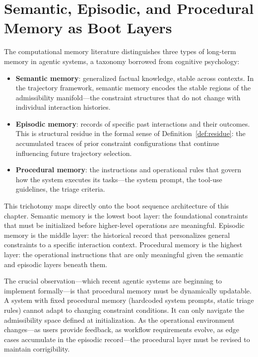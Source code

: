 \section{Semantic, Episodic, and Procedural Memory as Boot Layers}

The computational memory literature distinguishes three types of long-term memory
in agentic systems, a taxonomy borrowed from cognitive psychology:

\begin{itemize}
  \item \textbf{Semantic memory}: generalized factual knowledge, stable across
    contexts. In the trajectory framework, semantic memory encodes the stable
    regions of the admissibility manifold---the constraint structures that do
    not change with individual interaction histories.
  \item \textbf{Episodic memory}: records of specific past interactions and
    their outcomes. This is structural residue in the formal sense of
    Definition~\ref{def:residue}: the accumulated traces of prior constraint
    configurations that continue influencing future trajectory selection.
  \item \textbf{Procedural memory}: the instructions and operational rules that
    govern how the system executes its tasks---the system prompt, the tool-use
    guidelines, the triage criteria.
\end{itemize}

\claimP This trichotomy maps directly onto the boot sequence architecture of
this chapter. Semantic memory is the lowest boot layer: the foundational
constraints that must be initialized before higher-level operations are
meaningful. Episodic memory is the middle layer: the historical record that
personalizes general constraints to a specific interaction context. Procedural
memory is the highest layer: the operational instructions that are only
meaningful given the semantic and episodic layers beneath them.

The crucial observation---which recent agentic systems are beginning to implement
formally---is that procedural memory must be dynamically updatable. A system with
fixed procedural memory (hardcoded system prompts, static triage rules) cannot
adapt to changing constraint conditions. It can only navigate the admissibility
space defined at initialization. As the operational environment changes---as
users provide feedback, as workflow requirements evolve, as edge cases accumulate
in the episodic record---the procedural layer must be revised to maintain
corrigibility.

